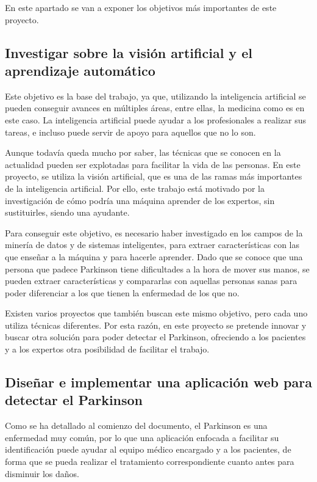 
En este apartado se van a exponer los objetivos más importantes de este proyecto.

\subsection{Investigar sobre la visión artificial y el aprendizaje automático}
Este objetivo es la base del trabajo, ya que, utilizando la inteligencia artificial se pueden conseguir avances en múltiples áreas, entre ellas, la medicina como es en este caso. La inteligencia artificial puede ayudar a los profesionales a realizar sus tareas, e incluso puede servir de apoyo para aquellos que no lo son.

Aunque todavía queda mucho por saber, las técnicas que se conocen en la actualidad pueden ser explotadas para facilitar la vida de las personas. En este proyecto, se utiliza la visión artificial, que es una de las ramas más importantes de la inteligencia artificial. Por ello, este trabajo está motivado por la investigación de cómo podría una máquina aprender de los expertos, sin sustituirles, siendo una ayudante.

Para conseguir este objetivo, es necesario haber investigado en los campos de la minería de datos y de sistemas inteligentes, para extraer características con las que enseñar a la máquina y para hacerle aprender. Dado que se conoce que una persona que padece Parkinson tiene dificultades a la hora de mover sus manos, se pueden extraer características y compararlas con aquellas personas sanas para poder diferenciar a los que tienen la enfermedad de los que no.

Existen varios proyectos que también buscan este mismo objetivo, pero cada uno utiliza técnicas diferentes. Por esta razón, en este proyecto se pretende innovar y buscar otra solución para poder detectar el Parkinson, ofreciendo a los pacientes y a los expertos otra posibilidad de facilitar el trabajo.

\subsection{Diseñar e implementar una aplicación web para detectar el Parkinson}
Como se ha detallado al comienzo del documento, el Parkinson es una enfermedad muy común, por lo que una aplicación enfocada a facilitar su identificación puede ayudar al equipo médico encargado y a los pacientes, de forma que se pueda realizar el tratamiento correspondiente cuanto antes para disminuir los daños.

